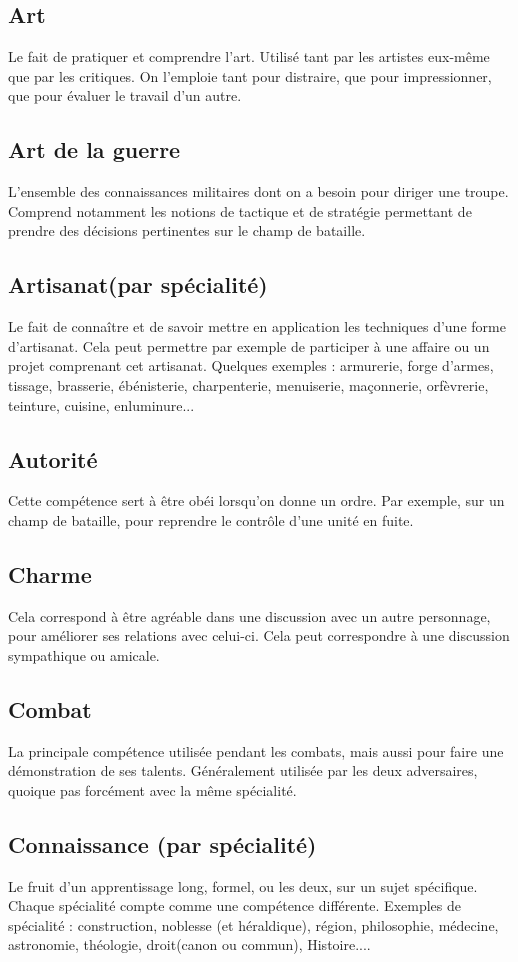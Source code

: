 \documentclass[10pt,a4paper]{book}
\begin{document}
\subsection*{Art} Le fait de pratiquer et comprendre l'art. Utilisé tant par les artistes eux-même que par les critiques. On l'emploie tant pour distraire, que pour impressionner, que pour évaluer le travail d'un autre.
\subsection*{Art de la guerre} L'ensemble des connaissances militaires dont on a besoin pour diriger une troupe. Comprend notamment les notions de tactique et de stratégie permettant de prendre des décisions pertinentes sur le champ de bataille.
\subsection*{Artisanat(par spécialité)} Le fait de connaître et de savoir mettre en application les techniques d'une forme d'artisanat. Cela peut permettre par exemple de participer à une affaire ou un projet comprenant cet artisanat. Quelques exemples : armurerie, forge d'armes, tissage, brasserie, ébénisterie, charpenterie, menuiserie, maçonnerie, orfèvrerie, teinture, cuisine, enluminure...
\subsection*{Autorité} Cette compétence sert à être obéi lorsqu'on donne un ordre. Par exemple, sur un champ de bataille, pour reprendre le contrôle d'une unité en fuite.
\subsection*{Charme}Cela correspond à être agréable dans une discussion avec un autre personnage, pour améliorer ses relations avec celui-ci. Cela peut correspondre à une discussion sympathique ou amicale.
\subsection*{Combat} La principale compétence utilisée pendant les combats, mais aussi pour faire une démonstration de ses talents. Généralement utilisée par les deux adversaires, quoique pas forcément avec la même spécialité.
\subsection*{Connaissance (par spécialité)} Le fruit d'un apprentissage long, formel, ou les deux, sur un sujet spécifique. Chaque spécialité compte comme une compétence différente. Exemples de spécialité : construction, noblesse (et héraldique), région, philosophie, médecine, astronomie, théologie, droit(canon ou commun), Histoire....
\end{document}
